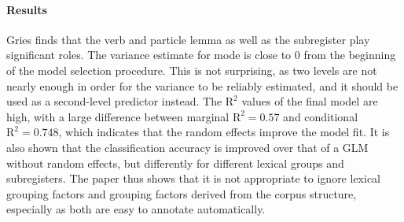 {\begin{minipage}{\textwidth}
  \paragraph{Results}

  Gries finds that the verb and particle lemma as well as the subregister play significant roles.
  The variance estimate for mode is close to 0 from the beginning of the model selection procedure.
  This is not surprising, as two levels are not nearly enough in order for the variance to be reliably estimated, and it should be used as a second-level predictor instead.
  The $\mathrm{R}^{\mathrm{2}}$ values of the final model are high, with a large difference between marginal $\mathrm{R}^{\mathrm{2}}=0.57$ and conditional $\mathrm{R}^{\mathrm{2}}=0.748$, which indicates that the random effects improve the model fit.
  It is also shown that the classification accuracy is improved over that of a GLM without random effects, but differently for different lexical groups and subregisters.
  The paper thus shows that it is not appropriate to ignore lexical grouping factors and grouping factors derived from the corpus structure, especially as both are easy to annotate automatically.

\end{minipage}}

\newpage
